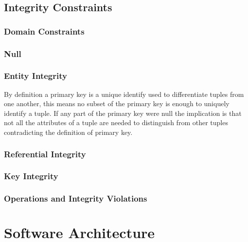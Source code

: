 \documentclass[12pt letter]{report}
\begin{document}
\subsection{Integrity Constraints}

\subsubsection{Domain Constraints}

\subsubsection{Null}

\subsubsection{Entity Integrity}


By definition a primary key is a unique identify used to differentiate tuples from one another, this means no subset of
the primary key is enough to uniquely identify a tuple. If any part of the primary key were null the implication is that
not all the attributes of a tuple are needed to distinguish from other tuples contradicting the definition of primary
key.

\subsubsection{Referential Integrity}

\subsubsection{Key Integrity}

\subsubsection{Operations and Integrity Violations}

\section{Software Architecture}
\end{document}
